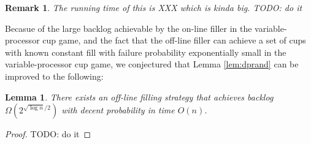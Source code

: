 \documentclass{article}[11pt]
\newtheorem{remark}{Remark}
\newtheorem{lemma}{Lemma}
\begin{document}
\begin{remark}
  The running time of this is XXX which is kinda big.
  {\color{red} TODO: do it}
\end{remark}


Becasue of the large backlog achievable by the on-line filler in the
variable-processor cup game, and the fact that the off-line filler can 
achieve a set of cups with known constant fill with failure probability
exponentially small in the variable-processor cup game, we conjectured that 
Lemma \ref{lem:dprand} can be improved to the following:
\begin{lemma}
  There exists an off-line filling strategy that achieves backlog
  $\Omega(2^{\sqrt{\log n}/2})$ with decent probability in time $O(n)$.
\end{lemma}
\begin{proof}
  {\color{red} TODO: do it}
  
\end{proof}
\end{document}
